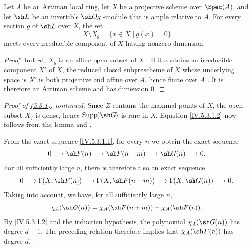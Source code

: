 \begin{lemma}[5.3.1.3]
\label{IV.5.3.1.3}
Let $A$ be an Artinian local ring, let $X$ be a projective scheme over
$\Spec(A)$, and let $\sh L$ be an invertible $\sh O_X$-module that is
ample relative to $A$.
For every section $g$ of $\sh L$ over $X$, the set
\[
X\setminus X_g=\{x\in X\mid g(x)=0\}
\]
meets every irreducible component of $X$ having nonzero dimension.
\end{lemma}

\begin{proof}
Indeed, $X_g$ is an affine open subset of $X$
.
If it contains an irreducible component $X'$ of $X$, the reduced
closed subprescheme of $X$ whose underlying space is $X'$ is both
projective and affine over $A$, hence finite over $A$
.
It is therefore an Artinian scheme and has dimension $0$.
\end{proof}

\begin{proof}[Proof of \emph{{\hyperlink{ega4.c04.prop.5-3-1}{(5.3.1)}}}, continued]
Since $Z$ contains the maximal points of $X$, the open subset $X_f$
is dense; hence $\operatorname{Supp}(\sh G)$ is rare in $X$.
Equation \eqref{IV.5.3.1.2} now follows from the lemma and
.


From the exact sequence \eqref{IV.5.3.1.1}, for every $n$ we obtain
the exact sequence
\[
0\longrightarrow\sh F(n)
 \longrightarrow\sh F(n+m)
 \longrightarrow\sh G(n)
 \longrightarrow0.
\]
For all sufficiently large $n$, there is therefore also an exact
sequence 
\[
0\longrightarrow\Gamma(X,\sh F(n))
 \longrightarrow\Gamma(X,\sh F(n+m))
 \longrightarrow\Gamma(X,\sh G(n))
 \longrightarrow0.
\]
Taking  into account, we have, for all
sufficiently large $n$,
\[
\chi_A(\sh G(n))
  =\chi_A(\sh F(n+m))-\chi_A(\sh F(n)).
\]
By \eqref{IV.5.3.1.2} and the induction hypothesis, the polynomial
$\chi_A(\sh G(n))$ has degree $d-1$.
The preceding relation therefore implies that
$\chi_A(\sh F(n))$ has degree $d$.
\end{proof}
